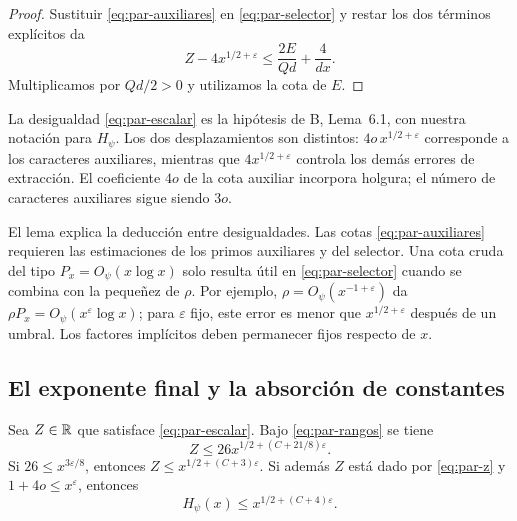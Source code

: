 \begin{proof}
Sustituir \eqref{eq:par-auxiliares} en
\eqref{eq:par-selector} y restar los dos términos explícitos da
\[
 Z-4x^{1/2+\varepsilon}
 \le \frac{2E}{Qd}+\frac{4}{dx}.
\]
Multiplicamos por $Qd/2>0$ y utilizamos la cota de $E$.
\end{proof}

La desigualdad \eqref{eq:par-escalar} es la hipótesis de B,
Lema~6.1, con nuestra notación para $H_\psi$. Los dos desplazamientos
son distintos: $4o\,x^{1/2+\varepsilon}$ corresponde a los caracteres
auxiliares, mientras que $4x^{1/2+\varepsilon}$ controla los demás
errores de extracción. El coeficiente $4o$ de la cota auxiliar
incorpora holgura; el número de caracteres auxiliares sigue siendo
$3o$.

El lema explica la deducción entre desigualdades. Las cotas
\eqref{eq:par-auxiliares} requieren las estimaciones de los primos
auxiliares y del selector. Una cota cruda del tipo
$P_x=O_\psi(x\log x)$ solo resulta útil en \eqref{eq:par-selector}
cuando se combina con la pequeñez de $\rho$. Por ejemplo,
$\rho=O_\psi(x^{-1+\varepsilon})$ da
$\rho P_x=O_\psi(x^\varepsilon\log x)$; para $\varepsilon$ fijo,
este error es menor que $x^{1/2+\varepsilon}$ después de un umbral.
Los factores implícitos deben permanecer fijos respecto de $x$.

\subsection{El exponente final y la absorción de constantes}

\begin{proposicion}
\label{prop:par-cierre}
Sea $Z\in\mathbb{R}$ que satisface \eqref{eq:par-escalar}.
Bajo \eqref{eq:par-rangos} se tiene
\begin{equation}
 Z\le26x^{1/2+(C+21/8)\varepsilon}.
 \label{eq:par-veintiseis}
\end{equation}
Si $26\le x^{3\varepsilon/8}$, entonces
$Z\le x^{1/2+(C+3)\varepsilon}$.
Si además $Z$ está dado por \eqref{eq:par-z} y
$1+4o\le x^\varepsilon$, entonces
\begin{equation}
 H_\psi(x)\le x^{1/2+(C+4)\varepsilon}.
 \label{eq:par-cierre}
\end{equation}
\end{proposicion}

